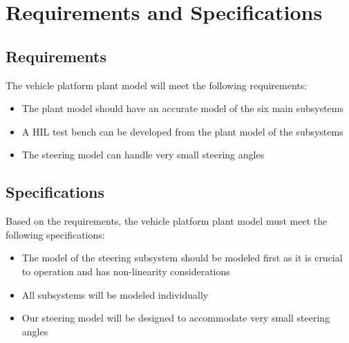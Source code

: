 \documentclass[12pt]{article} %
\begin{document}
\section{Requirements and Specifications}
\subsection{Requirements}
The vehicle platform plant model will meet the following requirements:
\begin{itemize}
    \item The plant model should have an accurate model of the six main subsystems
    \item A HIL test bench can be developed from the plant model of the subsystems
    \item The steering model can handle very small steering angles
\end{itemize}

\subsection{Specifications}
Based on the requirements, the vehicle platform plant model must meet the following specifications:
\begin{itemize}
    \item The model of the steering subsystem should be modeled first as it is crucial to operation and has non-linearity considerations
    \item All subsystems will be modeled individually 
    \item Our steering model will be designed to accommodate very small steering angles
\end{itemize}

\end{document}

